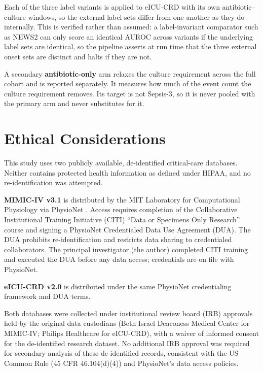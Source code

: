 Each of the three label variants is applied to eICU-CRD with its own
antibiotic--culture windows, so the external label sets differ from one another
as they do internally. This is verified rather than assumed: a
label-invariant comparator such as NEWS2 can only score an identical AUROC
across variants if the underlying label sets are identical, so the pipeline
asserts at run time that the three external onset sets are distinct and halts
if they are not.

A secondary \textbf{antibiotic-only} arm relaxes the culture requirement across
the full cohort and is reported separately. It measures how much of the event
count the culture requirement removes. Its target is not Sepsis-3, so it is
never pooled with the primary arm and never substitutes for it.


\section{Ethical Considerations}
\label{sec:ethics}

This study uses two publicly available, de-identified critical-care databases.
Neither contains protected health information as defined under HIPAA, and no
re-identification was attempted.

\textbf{MIMIC-IV v3.1} is distributed by the MIT Laboratory for Computational
Physiology via PhysioNet \cite{johnson2023mimiciv}. Access requires completion
of the Collaborative Institutional Training Initiative (CITI) ``Data or
Specimens Only Research'' course and signing a PhysioNet Credentialed Data Use
Agreement (DUA). The DUA prohibits re-identification and restricts data sharing
to credentialed collaborators. The principal investigator (the author) completed
CITI training and executed the DUA before any data access; credentials are on
file with PhysioNet.

\textbf{eICU-CRD v2.0} \cite{pollard2018eicu} is distributed under the same
PhysioNet credentialing framework and DUA terms.

Both databases were collected under institutional review board (IRB) approvals
held by the original data custodians (Beth Israel Deaconess Medical Center for
MIMIC-IV; Philips Healthcare for eICU-CRD), with a waiver of informed consent
for the de-identified research dataset. No additional IRB approval was required
for secondary analysis of these de-identified records, consistent with the US
Common Rule (45 CFR 46.104(d)(4)) and PhysioNet's data access policies.


